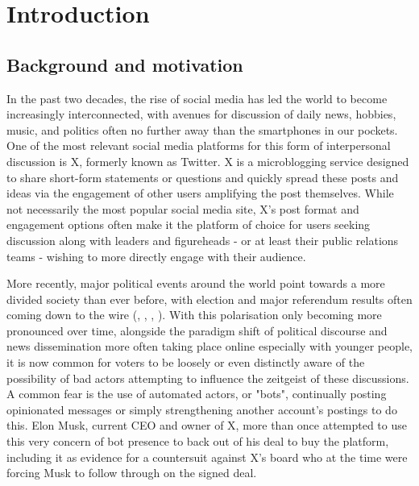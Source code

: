 \documentclass[a4paper,11pt]{article}  %
\begin{document}
	\section{Introduction}
	\label{sec:intro}

	\subsection{Background and motivation}
	\label{subsec:background}
	In the past two decades, the rise of social media has led the world to become increasingly interconnected, with avenues for discussion of daily news, hobbies, music, and politics often no further away than the smartphones in our pockets. One of the most relevant social media platforms for this form of interpersonal discussion is X, formerly known as Twitter. X is a microblogging service designed to share short-form statements or questions and quickly spread these posts and ideas via the engagement of other users amplifying the post themselves. While not necessarily the most popular social media site\parencite{BiggestSocialMedia}, X's post format and engagement options often make it the platform of choice for users seeking discussion along with leaders and figureheads - or at least their public relations teams - wishing to more directly engage with their audience.
	
	More recently, major political events around the world point towards a more divided society than ever before, with election and major referendum results often coming down to the wire (\textcite{EUReferendumResults}, \textcite{FederalElections2016a}, \textcite{FederalElections2020a}, \textcite{SIGEleicaoResultados}). With this polarisation only becoming more pronounced over time, alongside the paradigm shift of political discourse and news dissemination more often taking place online especially with younger people\parencite{shearerSocialMediaOutpaces}, it is now common for voters to be loosely or even distinctly aware of the possibility of bad actors attempting to influence the zeitgeist of these discussions. A common fear is the use of automated actors, or "bots", continually posting opinionated messages or simply strengthening another account's postings to do this. Elon Musk, current CEO and owner of X, more than once attempted to use this very concern of bot presence to back out of his deal to buy the platform, including it as  evidence for a countersuit against X's board \parencite{MuskPublicVersion}\parencite{elonmusk[@elonmusk]Teslarati20Fake2022} who at the time were forcing Musk to follow through on the signed deal. 
\end{document}
